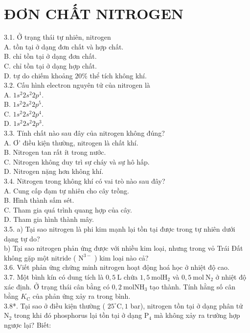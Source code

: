 \documentclass[10pt]{article}
\begin{document}
\section*{ĐƠN CHẤT NITROGEN}
3.1. Ở trạng thái tự nhiên, nitrogen\\
A. tồn tại ở dạng đơn chất và hợp chất.\\
B. chỉ tồn tại ở dạng đơn chất.\\
C. chỉ tồn tại ở dạng hợp chất.\\
D. tự do chiếm khoảng $20 \%$ thể tích không khí.\\
3.2. Cấu hình electron nguyên tử của nitrogen là\\
A. $1 s^{2} 2 s^{2} 2 p^{1}$.\\
B. $1 s^{2} 2 s^{2} 2 p^{5}$.\\
C. $1 s^{2} 2 s^{2} 2 p^{4}$.\\
D. $1 s^{2} 2 s^{2} 2 p^{3}$.\\
3.3. Tính chất nào sau đây của nitrogen không đúng?\\
A. Ơ' điều kiện thường, nitrogen là chất khí.\\
B. Nitrogen tan rất ít trong nước.\\
C. Nitrogen không duy trì sự cháy và sự hô hấp.\\
D. Nitrogen nặng hơn không khí.\\
3.4. Nitrogen trong không khí có vai trò nào sau đây?\\
A. Cung cấp đạm tự nhiên cho cây trồng.\\
B. Hình thành sấm sét.\\
C. Tham gia quá trình quang hợp của cây.\\
D. Tham gia hình thành mây.\\
3.5. a) Tại sao nitrogen là phi kim mạnh lại tồn tại được trong tự nhiên dưới dạng tự do?\\
b) Tại sao nitrogen phản ứng được với nhiều kim loại, nhưng trong vỏ Trái Đất không gặp một nitride ( $\mathrm{N}^{3-}$ ) kim loại nào cả?\\
3.6. Viết phản ứng chứng minh nitrogen hoạt động hoá học ở nhiệt độ cao.\\
3.7. Một bình kín có dung tích là $0,5 \mathrm{~L}$ chứa $1,5 \mathrm{~mol} \mathrm{H}_{2}$ và $0,5 \mathrm{~mol} \mathrm{~N}_{2}$ ở nhiệt độ xác định. Ở trạng thái cân bằng có $0,2 \mathrm{~mol} \mathrm{NH}_{3}$ tạo thành. Tính hằng số cân bằng $K_{\mathrm{C}}$ của phản ứng xảy ra trong bình.\\
3.8*. Tại sao ở điều kiện thường ( $25^{\circ} \mathrm{C}, 1$ bar), nitrogen tồn tại ở dạng phân tử $\mathrm{N}_{2}$ trong khi đó phosphorus lại tồn tại ở dạng $\mathrm{P}_{4}$ mà không xảy ra trường hợp ngược lại? Biết:
\end{document}
